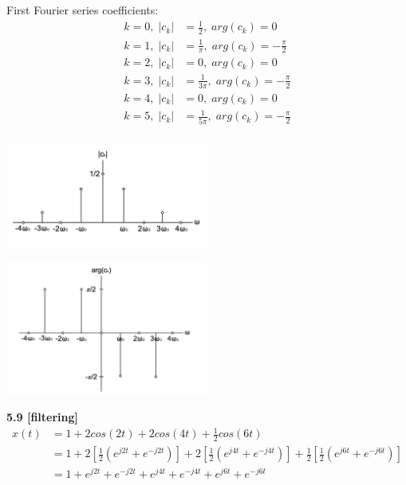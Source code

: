 \documentclass{article}
\begin{document}
First Fourier series coefficients:
\begin{equation*}
\begin{split}
    k = 0, \; |c_k| &= \frac{1}{2}, \; arg(c_k) = 0\\
    k = 1, \; |c_k| &= \frac{1}{\pi}, \; arg(c_k) = -\frac{\pi}{2}\\
    k = 2, \; |c_k| &= 0, \; arg(c_k) = 0\\
    k = 3, \; |c_k| &= \frac{1}{3\pi}, \; arg(c_k) = -\frac{\pi}{2}\\
    k = 4, \; |c_k| &= 0, \; arg(c_k) = 0\\
    k = 5, \; |c_k| &= \frac{1}{5\pi}, \; arg(c_k) = -\frac{\pi}{2}\\
\end{split}
\end{equation*}

\begin{center}
    \includegraphics[width=0.5\textwidth]{581.png}
\end{center}

\begin{center}
    \includegraphics[width=0.5\textwidth]{582.png}
\end{center}

\bigskip
{\bf 5.9 [filtering]}\\
\begin{equation*}
\begin{split}
    x(t) &= 1 + 2cos(2t) + 2cos(4t) + \frac{1}{2}cos(6t)\\
    &= 1 + 2[\frac{1}{2}(e^{j2t} + e^{-j2t})] + 2[\frac{1}{2}(e^{j4t} + e^{-j4t})] + \frac{1}{2}[\frac{1}{2}(e^{j6t} + e^{-j6t})]\\
    &= 1 + e^{j2t} + e^{-j2t} + e^{j4t} + e^{-j4t} + e^{j6t} + e^{-j6t}\\
\end{split}
\end{equation*}
\end{document}

